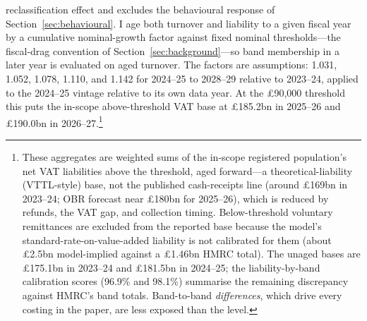 reclassification effect and excludes the behavioural response of
Section~\ref{sec:behavioural}. I age both turnover and liability to a given
fiscal year by a cumulative nominal-growth factor against fixed nominal
thresholds---the fiscal-drag convention of Section~\ref{sec:background}---so
band membership in a later year is evaluated on aged turnover. The factors are
assumptions: 1.031, 1.052, 1.078, 1.110, and 1.142 for 2024--25 to 2028--29
relative to 2023--24, applied to the 2024--25 vintage relative to its own data
year. At the \pounds90{,}000 threshold this puts the in-scope above-threshold
VAT base at \pounds185.2bn in 2025--26 and \pounds190.0bn in
2026--27.\footnote{These aggregates are weighted sums of the in-scope
registered population's net VAT liabilities above the threshold, aged
forward---a theoretical-liability (VTTL-style) base, not the published
cash-receipts line (around \pounds169bn in 2023--24; OBR forecast near
\pounds180bn for 2025--26), which is reduced by refunds, the VAT gap, and
collection timing. Below-threshold voluntary remittances are excluded from the
reported base because the model's standard-rate-on-value-added liability is not
calibrated for them (about \pounds2.5bn model-implied against a \pounds1.46bn
HMRC total). The unaged bases are \pounds175.1bn in 2023--24 and \pounds181.5bn
in 2024--25; the liability-by-band calibration scores (96.9\% and
98.1\%) summarise the remaining discrepancy against HMRC's band totals.
Band-to-band \emph{differences}, which drive every costing in the paper, are
less exposed than the level.}

